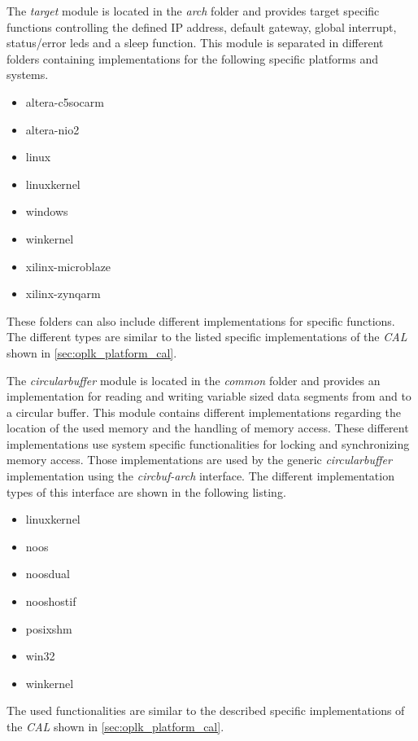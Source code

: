 \begin{description}[leftmargin=1cm]
    \item[target] The \emph{target} module is located in the \emph{arch} folder and provides target specific functions controlling the defined IP address, default gateway, global interrupt, status/error leds and a sleep function.
    This module is separated in different folders containing implementations for the following specific platforms and systems.
    \begin{multicols}{3}
        \begin{itemize}
            \item altera-c5socarm
            \item altera-nio2
            \item linux
            \item linuxkernel
            \item windows
            \item winkernel
            \item xilinx-microblaze
            \item xilinx-zynqarm
        \end{itemize}
    \end{multicols}
    These folders can also include different implementations for specific functions.
    The different types are similar to the listed specific implementations of the \emph{CAL} shown in \ref{sec:oplk_platform_cal}.\\
    
    \item[circularbuffer] The \emph{circularbuffer} module is located in the \emph{common} folder and provides an implementation for reading and writing variable sized data segments from and to a circular buffer.
    This module contains different implementations regarding the location of the used memory and the handling of memory access.
    These different implementations use system specific functionalities for locking and synchronizing memory access.
    Those implementations are used by the generic \emph{circularbuffer} implementation using the \emph{circbuf-arch} interface.
    The different implementation types of this interface are shown in the following listing.
    \begin{multicols}{3}
        \begin{itemize}
            \item linuxkernel
            \item noos
            \item noosdual
            \item nooshostif
            \item posixshm
            \item win32
            \item winkernel
        \end{itemize}
    \end{multicols}
    The used functionalities are similar to the described specific implementations of the \emph{CAL} shown in \ref{sec:oplk_platform_cal}.\\
    

\end{description}

